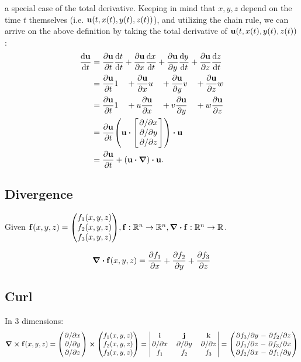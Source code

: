 a special case of the total derivative. Keeping in mind that $x, y, z$ depend on
the time $t$ themselves (i.e. $\vb{u}(t, x(t), y(t), z(t))$), and utilizing the
chain rule, we can arrive on the above definition by taking the total derivative
of $\vb{u}(t, x(t), y(t), z(t))$:
\begin{alignat*}{2}
    \dv{\vb{u}}{t} &= \pdv{\vb{u}}{t}\dv{t}{t} 
                    + \pdv{\vb{u}}{x}\dv{x}{t} 
                    + \pdv{\vb{u}}{y}\dv{y}{t} 
                    + \pdv{\vb{u}}{z}\dv{z}{t} \\
                    &= \pdv{\vb{u}}{t} 1 \quad
                    + \pdv{\vb{u}}{x} u \quad
                    + \pdv{\vb{u}}{y} v \quad
                    + \pdv{\vb{u}}{z} w \\
                    &= \pdv{\vb{u}}{t} 1 \quad
                    + u \pdv{\vb{u}}{x} \quad
                    + v \pdv{\vb{u}}{y} \quad
                    + w \pdv{\vb{u}}{z} \\
                    &= \pdv{\vb{u}}{t}
                    \qty(
                        \vb{u}
                        \vdot
                        \mqty[ \pdv*{x} \\ \pdv*{y} \\ \pdv*{z} ]
                    ) \vdot \vb{u} \\
                    &= \pdv{\vb{u}}{t}
                    + \qty(\vb{u}\vdot\grad)\vdot\vb{u}.
\end{alignat*}

\subsection{Divergence}
Given $\vb{f}(x,y,z) = \mqty(f_1(x,y,z)\\f_2(x,y,z)\\f_3(x,y,z)), 
\vb{f}: \mathbb{R}^n \to \mathbb{R}^n, \div{\vb{f}}:
\mathbb{R}^n\to\mathbb{R}$.

$$\div{\vb{f}(x,y,z)} = \pdv{f_1}{x}+\pdv{f_2}{y}+\pdv{f_3}{z}$$

\subsection{Curl}
In 3 dimensions:
$$\curl{\vb{f}(x,y,z) = 
    \mqty(\pdv*{x} \\ \pdv*{y} \\ \pdv*{z}) \cross 
    \mqty(f_1(x,y,z) \\ f_2(x,y,z) \\ f_3(x,y,z))
= \mqty|
    \vb{i}   & \vb{j}   & \vb{k}   \\
    \pdv*{x} & \pdv*{y} & \pdv*{z} \\
    f_1      & f_2      & f_3
|} = \mqty(
\pdv*{f_3}{y} - \pdv*{f_2}{z} \\
\pdv*{f_1}{z} - \pdv*{f_3}{x} \\
\pdv*{f_2}{x} - \pdv*{f_1}{y}
)$$

